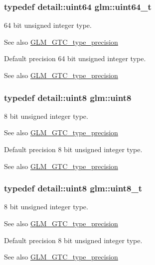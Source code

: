 \subsubsection[{uint64\+\_\+t}]{\setlength{\rightskip}{0pt plus 5cm}typedef detail\+::uint64 {\bf glm\+::uint64\+\_\+t}}\label{group__gtc__type__precision_ga058f57c19e1befdcf12498944bd73e69}
64 bit unsigned integer type. \begin{DoxySeeAlso}{See also}
\hyperlink{group__gtc__type__precision}{G\+L\+M\+\_\+\+G\+T\+C\+\_\+type\+\_\+precision}
\end{DoxySeeAlso}
Default precision 64 bit unsigned integer type. \begin{DoxySeeAlso}{See also}
\hyperlink{group__gtc__type__precision}{G\+L\+M\+\_\+\+G\+T\+C\+\_\+type\+\_\+precision} 
\end{DoxySeeAlso}
\hypertarget{group__gtc__type__precision_ga1a7dcd8aac97cc8020817c94049deff2}{}
\subsubsection[{uint8}]{\setlength{\rightskip}{0pt plus 5cm}typedef detail\+::uint8 {\bf glm\+::uint8}}\label{group__gtc__type__precision_ga1a7dcd8aac97cc8020817c94049deff2}
8 bit unsigned integer type. \begin{DoxySeeAlso}{See also}
\hyperlink{group__gtc__type__precision}{G\+L\+M\+\_\+\+G\+T\+C\+\_\+type\+\_\+precision}
\end{DoxySeeAlso}
Default precision 8 bit unsigned integer type. \begin{DoxySeeAlso}{See also}
\hyperlink{group__gtc__type__precision}{G\+L\+M\+\_\+\+G\+T\+C\+\_\+type\+\_\+precision} 
\end{DoxySeeAlso}
\hypertarget{group__gtc__type__precision_ga93adf6dd9803408f3e3aaf9dedda352b}{}
\subsubsection[{uint8\+\_\+t}]{\setlength{\rightskip}{0pt plus 5cm}typedef {\bf detail\+::uint8} {\bf glm\+::uint8\+\_\+t}}\label{group__gtc__type__precision_ga93adf6dd9803408f3e3aaf9dedda352b}
8 bit unsigned integer type. \begin{DoxySeeAlso}{See also}
\hyperlink{group__gtc__type__precision}{G\+L\+M\+\_\+\+G\+T\+C\+\_\+type\+\_\+precision}
\end{DoxySeeAlso}
Default precision 8 bit unsigned integer type. \begin{DoxySeeAlso}{See also}
\hyperlink{group__gtc__type__precision}{G\+L\+M\+\_\+\+G\+T\+C\+\_\+type\+\_\+precision} 
\end{DoxySeeAlso}
